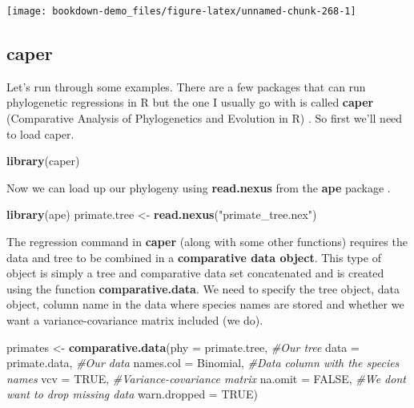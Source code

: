 \documentclass[
]{book}
\newenvironment{Shaded}{\begin{snugshade}}{\end{snugshade}}
\newcommand{\CommentTok}[1]{\textcolor[rgb]{0.56,0.35,0.01}{\textit{#1}}}
\newcommand{\DataTypeTok}[1]{\textcolor[rgb]{0.13,0.29,0.53}{#1}}
\newcommand{\KeywordTok}[1]{\textcolor[rgb]{0.13,0.29,0.53}{\textbf{#1}}}
\newcommand{\NormalTok}[1]{#1}
\newcommand{\OtherTok}[1]{\textcolor[rgb]{0.56,0.35,0.01}{#1}}
\newcommand{\StringTok}[1]{\textcolor[rgb]{0.31,0.60,0.02}{#1}}
\begin{document}
\begin{center}\texttt{[image: bookdown-demo\_files/figure-latex/unnamed-chunk-268-1]} \end{center}

\hypertarget{caper}{%
\subsection{caper}\label{caper}}

Let's run through some examples. There are a few packages that can run phylogenetic regressions in R but the one I usually go with is called \textbf{caper} (Comparative Analysis of Phylogenetics and Evolution in R) \citep{caper}. So first we'll need to load caper.

\begin{Shaded}
\begin{Highlighting}[]
\KeywordTok{library}\NormalTok{(caper)}
\end{Highlighting}
\end{Shaded}

Now we can load up our phylogeny using \textbf{read.nexus} from the \textbf{ape} package \citep{ape}.

\begin{Shaded}
\begin{Highlighting}[]
\KeywordTok{library}\NormalTok{(ape)}
\NormalTok{primate.tree \textless{}{-}}\StringTok{ }\KeywordTok{read.nexus}\NormalTok{(}\StringTok{"primate\_tree.nex"}\NormalTok{)}
\end{Highlighting}
\end{Shaded}

The regression command in \textbf{caper} (along with some other functions) requires the data and tree to be combined in a \textbf{comparative data object}. This type of object is simply a tree and comparative data set concatenated and is created using the function \textbf{comparative.data}. We need to specify the tree object, data object, column name in the data where species names are stored and whether we want a variance-covariance matrix included (we do).

\begin{Shaded}
\begin{Highlighting}[]
\NormalTok{primates \textless{}{-}}\StringTok{ }\KeywordTok{comparative.data}\NormalTok{(}\DataTypeTok{phy =}\NormalTok{ primate.tree,     }\CommentTok{\#Our tree}
                             \DataTypeTok{data =}\NormalTok{ primate.data,    }\CommentTok{\#Our data}
                             \DataTypeTok{names.col =}\NormalTok{ Binomial,   }\CommentTok{\#Data column with the species names}
                             \DataTypeTok{vcv =} \OtherTok{TRUE}\NormalTok{,             }\CommentTok{\#Variance{-}covariance matrix}
                             \DataTypeTok{na.omit =} \OtherTok{FALSE}\NormalTok{,        }\CommentTok{\#We don\textquotesingle{}t want to drop missing data}
                             \DataTypeTok{warn.dropped =} \OtherTok{TRUE}\NormalTok{)}
\end{Highlighting}
\end{Shaded}
\end{document}
